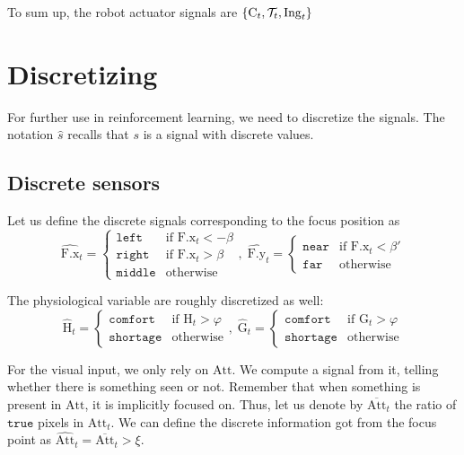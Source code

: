 \documentclass[10pt,a4paper]{article}
\newcommand{\True}[0]{\mathtt{true}}
\newcommand{\AttrOf}[2]{{#1}.\mathrm{#2}}
\newcommand{\Xof}[1]{\AttrOf{#1}x}
\newcommand{\Yof}[1]{\AttrOf{#1}y}
\newcommand{\Set}[1]{\left\{ {#1} \right\}}
\newcommand{\At}[2]{#1_{#2}}
\newcommand{\AtT}[1]{\At{#1}t}
\newcommand{\Attent}[0]{\mathrm{Att}}
\newcommand{\Interest}[0]{\mathrm{C}}
\newcommand{\Focus}[0]{\mathrm{F}}
\newcommand{\Hydro}[0]{\mathrm{H}}
\newcommand{\Glyco}[0]{\mathrm{G}}
\newcommand{\Twist}[0]{{\cal T}}
\newcommand{\Ingest}[0]{\mathrm{Ing}}
\newcommand{\Discr}[1]{\widehat{#1}}
\newcommand{\Avg}[1]{\overline{#1}}
\newcommand{\Label}[1]{\mathtt{#1}}
\newcommand{\Left}[0]{\Label{left}}
\newcommand{\Middle}[0]{\Label{middle}}
\newcommand{\Right}[0]{\Label{right}}
\newcommand{\Far}[0]{\Label{far}}
\newcommand{\Near}[0]{\Label{near}}
\newcommand{\Comfort}[0]{\Label{comfort}}
\newcommand{\Shortage}[0]{\Label{shortage}}
\newcommand{\FxThresh}[0]{\beta}
\newcommand{\FyThresh}[0]{\beta'}
\newcommand{\PhysioThresh}[0]{\varphi}
\newcommand{\FocusThresh}[0]{\xi}
\begin{document}
To sum up, the robot actuator signals are $\Set{\AtT\Interest,\AtT\Twist,\AtT\Ingest}$


\section{Discretizing}

For further use in reinforcement learning, we need to discretize the signals. The notation $\Discr s$ recalls that $s$ is a signal with discrete values.

\subsection{Discrete sensors}

Let us define the discrete signals corresponding to the focus position as
\begin{equation}
\AtT {\Discr{\Xof\Focus}} = \left\{\begin{array}{ll}
\Left & \mbox{if } \AtT{\Xof\Focus} < -\FxThresh \\
\Right & \mbox{if } \AtT{\Xof\Focus} > \FxThresh \\
\Middle & \mbox{otherwise}
\end{array}\right.,\; 
\AtT {\Discr{\Yof\Focus}} = \left\{\begin{array}{ll}
\Near & \mbox{if } \AtT{\Xof\Focus} < \FyThresh \\
\Far & \mbox{otherwise}
\end{array}\right.
\end{equation}


The physiological variable are roughly discretized as well:
\begin{equation}
\AtT {\Discr{\Hydro}} = \left\{\begin{array}{ll}
\Comfort & \mbox{if } \AtT\Hydro > \PhysioThresh \\
\Shortage & \mbox{otherwise}
\end{array}\right.,\; 
\AtT {\Discr{\Glyco}} = \left\{\begin{array}{ll}
\Comfort & \mbox{if } \AtT\Glyco > \PhysioThresh \\
\Shortage & \mbox{otherwise}
\end{array}\right.
\end{equation}

For the visual input, we only rely on $\Attent$. We compute a signal from it, telling whether there is something seen or not. Remember that when something is present in $\Attent$, it is implicitly focused on. Thus, let us denote by $\AtT {\Avg\Attent}$ the ratio of $\True$ pixels in $\AtT\Attent$. We can define the discrete information got from the focus point as $\AtT {\Discr\Attent} = \AtT {\Avg\Attent}>\FocusThresh$.
\end{document}
